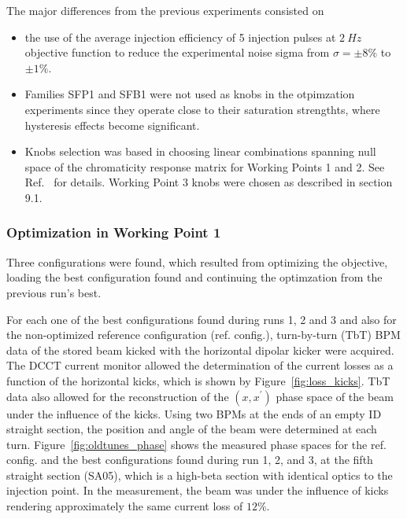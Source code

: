 The major differences from the previous experiments consisted on
\begin{itemize}
    \item the use of the average injection efficiency of 5 injection pulses at $2~\unit{Hz}$ objective function to reduce the experimental noise sigma from $\sigma=\pm8\%$ to $\pm1\%$.
    \item Families SFP1 and SFB1 were not used as knobs in the otpimzation experiments since they operate close to their saturation strengthts, where hysteresis effects become significant.
    \item Knobs selection was based in choosing linear combinations spanning null space of the chromaticity response matrix for Working Points 1 and 2. See Ref.~\cite{velloso:ipac23-wepl087} for details. Working Point 3 knobs were chosen as described in section 9.1.
\end{itemize}
\subsubsection{Optimization in Working Point 1}
Three configurations were found, which resulted from optimizing the objective, loading the best configuration found and continuing the optimzation from the previous run's best.

For each one of the best configurations found during runs 1, 2 and 3 and also for the non-optimized reference configuration (ref. config.), turn-by-turn (TbT) BPM data of the stored beam kicked with the horizontal dipolar kicker were acquired. The DCCT current monitor allowed the determination of the current losses as a function of the horizontal kicks, which is shown by Figure~\ref{fig:loss_kicks}.
TbT data also allowed for the reconstruction of the $(x,x^\prime)$ phase space of the beam under the influence of the kicks. Using two BPMs at the ends of an empty ID straight section, the position and angle of the beam were determined at each turn.
Figure~\ref{fig:oldtunes_phase} shows the measured phase spaces for the ref. config. and the best configurations found during run 1, 2, and 3, at the fifth straight section (SA05), which is a high-beta section with identical optics to the injection point. In the measurement, the beam was under the influence of kicks rendering approximately the same current loss of $12\%$.

